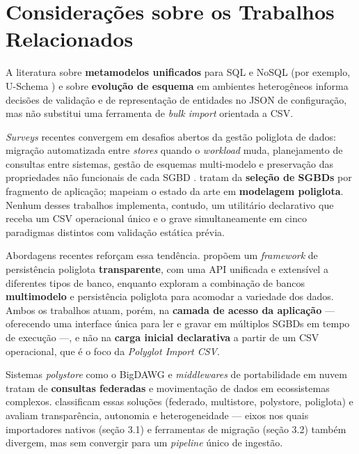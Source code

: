 \section{Considerações sobre os Trabalhos Relacionados}

A literatura sobre \textbf{metamodelos unificados} para SQL e NoSQL (por exemplo, U-Schema
\cite{fernandezcandel2022unified}) e sobre \textbf{evolução de esquema} em ambientes heterogêneos
\cite{chillon2023propagating,chillon2024schema} informa decisões de validação e de representação de entidades
no JSON de configuração, mas não substitui uma ferramenta de \textit{bulk import} orientada
a CSV.

\textit{Surveys} recentes convergem em desafios abertos da gestão poliglota de dados:
migração automatizada entre \textit{stores} quando o \textit{workload} muda, planejamento
de consultas entre sistemas, gestão de esquemas multi-modelo e preservação das propriedades
não funcionais de cada SGBD \cite{kiehn2022polyglot,glake2022towards}.
 tratam da \textbf{seleção de SGBDs} por fragmento de
aplicação;  mapeiam o estado da arte em \textbf{modelagem
poliglota}. Nenhum desses trabalhos implementa, contudo, um utilitário declarativo que
receba um CSV operacional único e o grave simultaneamente em cinco paradigmas
distintos com validação estática prévia.

Abordagens recentes reforçam essa tendência.  propõem um
\textit{framework} de persistência poliglota \textbf{transparente}, com uma {API} unificada e
extensível a diferentes tipos de banco, enquanto  exploram a
combinação de bancos \textbf{multimodelo} e persistência poliglota para acomodar a variedade dos
dados. Ambos os trabalhos atuam, porém, na \textbf{camada de acesso da aplicação} --- oferecendo
uma interface única para ler e gravar em múltiplos SGBDs em tempo de execução ---, e não na
\textbf{carga inicial declarativa} a partir de um CSV operacional, que é o foco da
\textit{Polyglot Import CSV}.

Sistemas \textit{polystore} como o BigDAWG \cite{duggan2015bigdawg} e \textit{middlewares}
de portabilidade em nuvem \cite{kaur2020middleware} tratam de \textbf{consultas federadas} e
movimentação de dados em ecossistemas complexos.  classificam
essas soluções (federado, multistore, polystore, poliglota) e avaliam transparência,
autonomia e heterogeneidade --- eixos nos quais importadores nativos (seção 3.1) e
ferramentas de migração (seção 3.2) também divergem, mas sem convergir para um
\textit{pipeline} único de ingestão.

